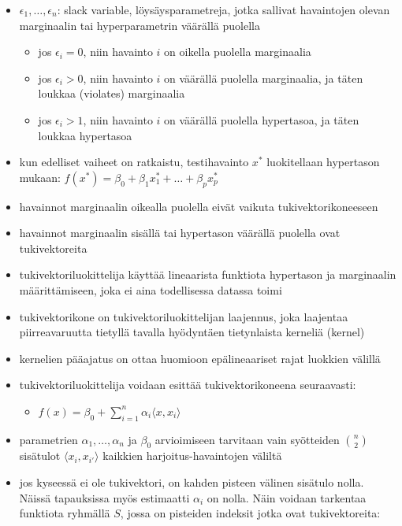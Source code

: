 \begin{itemize}
\begin{itemize}
        \item $\epsilon_1, \dots, \epsilon_n$: slack variable, löysäysparametreja, jotka sallivat havaintojen olevan marginaalin tai hyperparametrin väärällä puolella
        \begin{itemize}
            \item jos $\epsilon_i = 0$, niin havainto $i$ on oikella puolella marginaalia
            \item jos $\epsilon_i > 0$, niin havainto $i$ on väärällä puolella marginaalia, ja täten loukkaa (violates) marginaalia
            \item jos $\epsilon_i > 1$, niin havainto $i$ on väärällä puolella hypertasoa, ja täten loukkaa hypertasoa
        \end{itemize}
        \item kun edelliset vaiheet on ratkaistu, testihavainto $x^*$ luokitellaan hypertason mukaan: $f(x^*) = \beta_0 + \beta_1 x^*_1 + \dots + \beta_p x^*_p$
        \item havainnot marginaalin oikealla puolella eivät vaikuta tukivektorikoneeseen
        \item havainnot marginaalin sisällä tai hypertason väärällä puolella ovat tukivektoreita
        \item tukivektoriluokittelija käyttää lineaarista funktiota hypertason ja marginaalin määrittämiseen, joka ei aina todellisessa datassa toimi
        \item tukivektorikone on tukivektoriluokittelijan laajennus, joka laajentaa piirreavaruutta tietyllä tavalla hyödyntäen tietynlaista kerneliä (kernel)
        \item kernelien pääajatus on ottaa huomioon epälineaariset rajat luokkien välillä
        \item tukivektoriluokittelija voidaan esittää tukivektorikoneena seuraavasti:
        \begin{itemize}
            \item $f(x) = \beta_0 + \sum^n_{i=1} \alpha_i \langle x, x_i \rangle$
        \end{itemize}
        \item parametrien $\alpha_1, \dots, \alpha_n$ ja $\beta_0$ arvioimiseen tarvitaan vain syötteiden $\binom{n}{2}$ sisätulot $\langle x_i, x_{i'} \rangle$ kaikkien harjoitus-havaintojen väliltä
        \item jos kyseessä ei ole tukivektori, on kahden pisteen välinen sisätulo nolla. Näissä tapauksissa myös estimaatti $\alpha_i$ on nolla. Näin voidaan tarkentaa funktiota ryhmällä $S$, jossa on pisteiden indeksit jotka ovat tukivektoreita:

\end{itemize}
\end{itemize}
